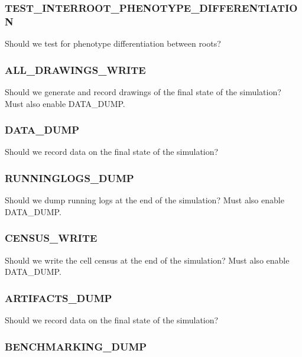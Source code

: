 \subsubsection{TEST\_INTERROOT\_PHENOTYPE\_DIFFERENTIATION}


Should we test for phenotype differentiation between roots?

\subsubsection{ALL\_DRAWINGS\_WRITE}


Should we generate and record drawings of the final state of the simulation?
Must also enable DATA\_DUMP.

\subsubsection{DATA\_DUMP}


Should we record data on the final state of the simulation?

\subsubsection{RUNNINGLOGS\_DUMP}


Should we dump running logs at the end of the simulation?
Must also enable DATA\_DUMP.

\subsubsection{CENSUS\_WRITE}


Should we write the cell census at the end of the simulation?
Must also enable DATA\_DUMP.

\subsubsection{ARTIFACTS\_DUMP}


Should we record data on the final state of the simulation?

\subsubsection{BENCHMARKING\_DUMP}

